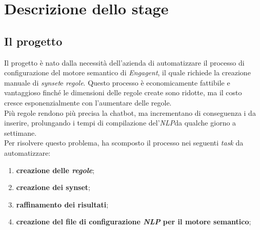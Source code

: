 
\chapter{Descrizione dello stage}
\label{cap:descrizione-stage}

\section{Il progetto}\label{sec:progetto}

Il progetto è nato dalla necessità dell'azienda \company{} di automatizzare il processo di configurazione del motore semantico di \emph{Engagent}\glsfirstoccur, il quale richiede la creazione manuale di \emph{synset}\glsfirstoccur e \emph{regole}\glsfirstoccur. Questo processo è economicamente fattibile e vantaggioso finché le dimensioni delle regole create sono ridotte, ma il costo cresce esponenzialmente con l'aumentare delle regole.\\
Più regole rendono più precisa la chatbot, ma incrementano di conseguenza i  da inserire, prolungando i tempi di compilazione del'\emph{NLP}\glsfirstoccur da qualche giorno a settimane.\\
Per risolvere questo problema, \company{} ha scomposto il processo nei seguenti \textit{task} da automatizzare:
\begin{enumerate}
    \item \textbf{creazione delle \emph{regole}\glsfirstoccur};
    \item \textbf{creazione dei synset};
    \item \textbf{raffinamento dei risultati};
    \item \textbf{creazione del file di configurazione \emph{NLP} per il motore semantico};
\end{enumerate}

